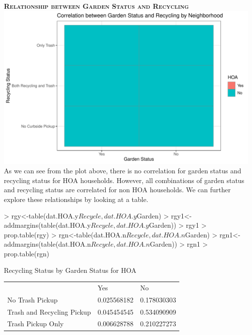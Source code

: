 \documentclass{article}
\begin{document}
\newpage
\textsc{\textbf{Relationship between Garden Status and Recycling}}
\newline
\newline
\includegraphics{part2-031}
\newline
As we can see from the plot above, there is no correlation for garden status and recycling status for HOA households. However, all combinations of garden status and recycling status are correlated for non HOA households. We can further explore these relationships by looking at a table.
\begin{Schunk}
\begin{Sinput}
> rgy<-table(dat.HOA.y$Recycle,dat.HOA.y$Garden)
> rgy1<-addmargins(table(dat.HOA.y$Recycle,dat.HOA.y$Garden))
> rgy1
> prop.table(rgy)
> rgn<-table(dat.HOA.n$Recycle,dat.HOA.n$Garden)
> rgn1<-addmargins(table(dat.HOA.n$Recycle,dat.HOA.n$Garden))
> rgn1
> prop.table(rgn)
\end{Sinput}
\end{Schunk}

\begin{center} Recycling Status by Garden Status for HOA \end{center}
\begin{table}[H]
\begin{tabular}{lll}
                           & Yes         & No          \\
No Trash Pickup            & 0.025568182 & 0.178030303 \\
Trash and Recycling Pickup & 0.045454545 & 0.534090909 \\
Trash Pickup Only          & 0.006628788 & 0.210227273
\end{tabular}
\end{table}
\end{document}
